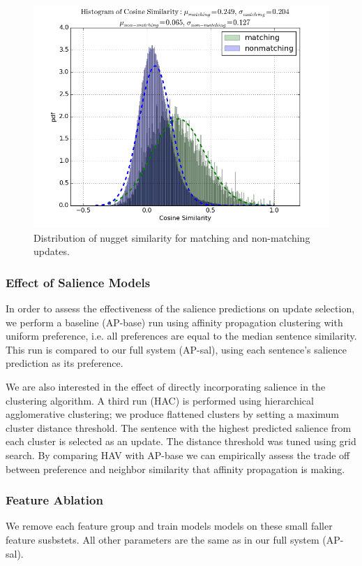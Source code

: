 \begin{figure}
\includegraphics[scale=.40]{match-dist.png} 
\caption{Distribution of nugget similarity for matching and non-matching 
updates.}
\end{figure}
\subsubsection{Effect of Salience Models}

In order to assess the effectiveness of the salience predictions on update
selection, we perform a baseline (AP-base) run using affinity propagation 
clustering
with uniform preference, i.e. all preferences are equal to the median sentence
similarity. This run is compared to our full system (AP-sal), using each
sentence's salience prediction as its preference. 

We are also interested
in the effect of directly incorporating salience in the clustering algorithm.
A third run (HAC) is performed using hierarchical agglomerative 
clustering; we produce flattened clusters by setting a maximum cluster 
distance threshold. The sentence with the highest predicted salience from each
 cluster is selected as an update. 
The distance threshold was tuned using grid search. By comparing
HAV with AP-base we can empirically assess the trade off between preference
and neighbor similarity that affinity propagation is making.

\subsubsection{Feature Ablation}

We remove each feature group and train models models on these small faller 
feature susbstets. All other parameters are the same as in our full system 
(AP-sal).



